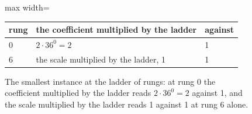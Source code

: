 \begin{figure}[h]
\centering
\begin{adjustbox}{max width=\linewidth}\begin{tabular}{lll}
\hline
rung & the coefficient multiplied by the ladder & against \\
\hline
0 & $2\cdot 36^{0} = 2$ & 1 \\
6 & the scale multiplied by the ladder, 1 & 1 \\
\hline
\end{tabular}\end{adjustbox}
\caption{The smallest instance at the ladder of rungs: at rung 0 the coefficient multiplied by the ladder reads $2\cdot 36^{0} = 2$ against 1, and the scale multiplied by the ladder reads 1 against 1 at rung 6 alone.}
\end{figure}
\par\medskip{}\label{narr:close:10-1}\par
